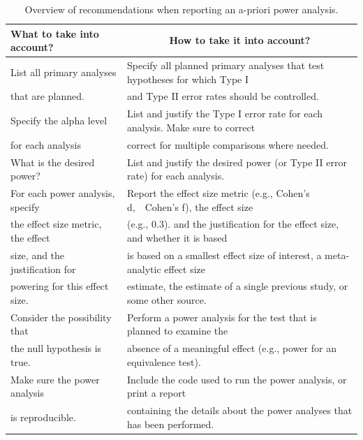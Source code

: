 \documentclass[
  english,
  ,jou, a4paper,floatsintext]{apa6}
\begin{document}
\begin{table}[tbp]

\begin{center}
\begin{threeparttable}

\caption{\label{tab:table-pow-rec-2}Overview of recommendations when reporting an a-priori power analysis.}

\begin{tabular}{ll}
\toprule
What to take into account? & \multicolumn{1}{c}{How to take it into account?}\\
\midrule
List all primary analyses & Specify all planned primary analyses that test hypotheses for which Type I\\
that are planned. & and Type II error rates should be controlled.\\ \midrule
Specify the alpha level & List and justify the Type I error rate for each analysis. Make sure to correct\\
for each analysis & correct for multiple comparisons where needed.\\ \midrule
What is the desired power? & List and justify the desired power (or Type II error rate) for each analysis.\\ \midrule
For each power analysis, specify & Report the effect size metric (e.g., Cohen's d,\ \ Cohen's f), the effect size\\
the effect size metric, the effect & (e.g., 0.3). and the justification for the effect size, and whether it is based\\
size, and the justification for & is based on a smallest effect size of interest, a meta-analytic effect size\\
powering for this effect size. & estimate, the estimate of a single previous study, or some other source.\\ \midrule
Consider the possibility that & Perform a power analysis for the test that is planned to examine the\\
the null hypothesis is true. & absence of a meaningful effect (e.g., power for an equivalence test).\\ \midrule
Make sure the power analysis & Include the code used to run the power analysis, or print a report\\
is reproducible. & containing the details about the power analyses that has been performed.\\
\bottomrule
\end{tabular}

\end{threeparttable}
\end{center}

\end{table}
\end{document}
